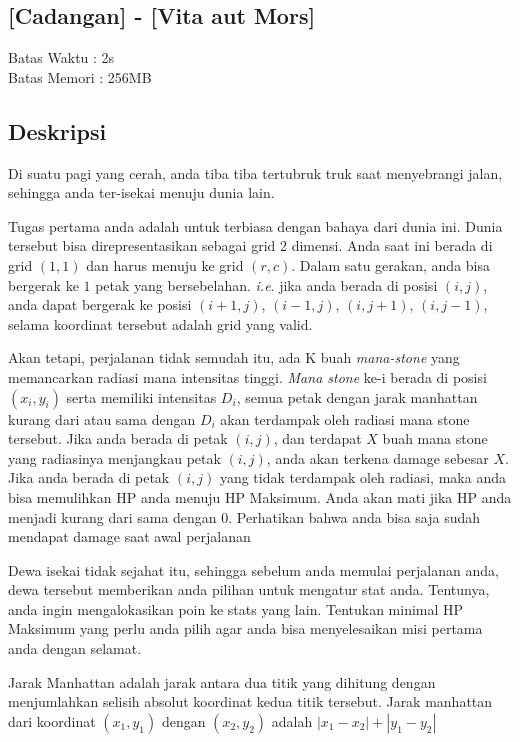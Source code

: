 \documentclass{article}
\begin{document}
\begin{center}
    \section*{[Cadangan] - [Vita aut Mors]} %
    Batas Waktu : 2s \\  %
    Batas Memori :  256MB \\ %
\end{center}

\subsection*{Deskripsi}

Di suatu pagi yang cerah, anda tiba tiba tertubruk truk saat menyebrangi jalan, sehingga anda ter-isekai menuju dunia lain.

Tugas pertama anda adalah untuk terbiasa dengan bahaya dari dunia ini. Dunia tersebut bisa direpresentasikan sebagai grid 2 dimensi. Anda saat ini berada di grid $(1, 1)$ dan harus menuju ke grid $(r, c)$. Dalam satu gerakan, anda bisa bergerak ke $1$ petak yang bersebelahan. \textit{i.e}. jika anda berada di posisi $(i, j)$, anda dapat bergerak ke posisi $(i+1, j)$, $(i-1, j)$, $(i, j+1)$, $(i, j-1)$, selama koordinat tersebut adalah grid yang valid.

Akan tetapi, perjalanan tidak semudah itu, ada K buah \textit{mana-stone} yang memancarkan radiasi mana intensitas tinggi. \textit{Mana stone} ke-i berada di posisi $(x_i, y_i)$ serta memiliki intensitas $D_i$, semua petak dengan jarak manhattan kurang dari atau sama dengan $D_i$ akan terdampak oleh radiasi mana stone tersebut. Jika anda berada di petak $(i, j)$, dan terdapat $X$ buah mana stone yang radiasinya menjangkau petak $(i, j)$, anda akan terkena damage sebesar $X$. Jika anda berada di petak $(i, j)$ yang tidak terdampak oleh radiasi, maka anda bisa memulihkan HP anda menuju HP Maksimum. Anda akan mati jika HP anda menjadi kurang dari sama dengan $0$. Perhatikan bahwa anda bisa saja sudah mendapat damage saat awal perjalanan

Dewa isekai tidak sejahat itu, sehingga sebelum anda memulai perjalanan anda, dewa tersebut memberikan anda pilihan untuk mengatur stat anda. Tentunya, anda ingin mengalokasikan poin ke stats yang lain. Tentukan minimal HP Maksimum yang perlu anda pilih agar anda bisa menyelesaikan misi pertama anda dengan selamat.

Jarak Manhattan adalah jarak antara dua titik yang dihitung dengan menjumlahkan selisih absolut koordinat kedua titik tersebut. Jarak manhattan dari koordinat $(x_1, y_1)$ dengan $(x_2, y_2)$ adalah $|x_1 - x_2| + |y_1 - y_2|$
\end{document}
